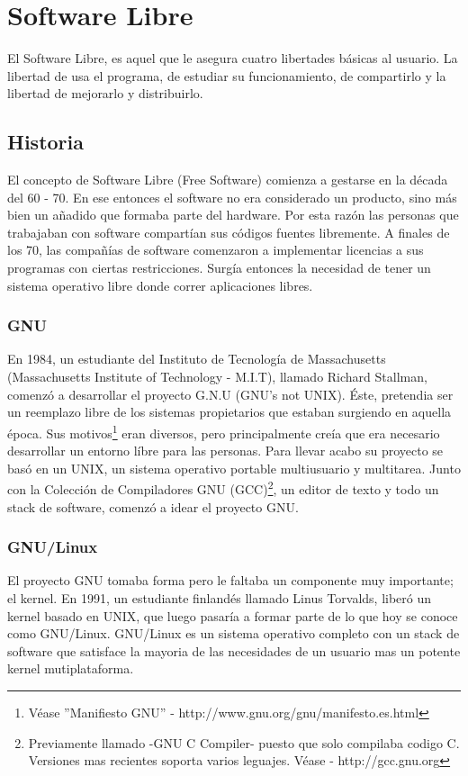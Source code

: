 \chapter{Software Libre}

El Software Libre, es aquel que le asegura cuatro libertades b\'asicas al
usuario. La libertad de usa el programa, de estudiar su funcionamiento, de
compartirlo y la libertad de mejorarlo y distribuirlo.

\section{Historia}
El concepto de Software Libre (Free Software) comienza a gestarse en la 
d\'ecada del 60 - 70. En ese entonces el software no era considerado un
producto, sino m\'as bien un a\~nadido que formaba parte del hardware. Por esta
raz\'on las personas que trabajaban con software compart\'ian sus c\'odigos
fuentes libremente. A finales de los 70, las compa\~n\'ias de software
comenzaron a implementar licencias a sus programas con ciertas restricciones. 
Surg\'ia entonces la necesidad de tener un sistema operativo libre donde
correr 
aplicaciones libres.


\subsection{GNU}
En 1984, un estudiante del Instituto de Tecnolog\'ia de Massachusetts
(Massachusetts Institute of Technology - M.I.T), llamado Richard Stallman, 
comenz\'o a desarrollar el proyecto G.N.U (GNU's not UNIX).
\'Este, pretendia ser un reemplazo libre de los sistemas propietarios que 
estaban surgiendo en aquella \'epoca.
Sus motivos\footnote{V\'ease ''Manifiesto GNU'' - 
http://www.gnu.org/gnu/manifesto.es.html} eran diversos, pero principalmente 
cre\'ia que era necesario desarrollar un entorno l\'ibre para las personas.
Para llevar acabo su proyecto se bas\'o en un UNIX, un sistema operativo 
portable multiusuario y multitarea. Junto con la Colecci\'on de Compiladores
GNU (GCC)\footnote{Previamente llamado -GNU C Compiler- puesto que solo
compilaba codigo C. Versiones mas recientes soporta varios leguajes. V\'ease -
http://gcc.gnu.org}, un editor de texto y todo un stack de software, comenz\'o
a idear el proyecto GNU.

\subsection{GNU/Linux}
El proyecto GNU tomaba forma pero le faltaba un componente muy importante; el
kernel. 
En 1991, un estudiante finland\'es llamado Linus Torvalds, liber\'o un kernel
basado en UNIX, que luego pasar\'ia a formar parte de lo que hoy se conoce como
GNU/Linux.
GNU/Linux es un sistema operativo completo con un stack de software que
satisface la mayoria de las necesidades de un usuario mas un potente kernel
mutiplataforma.

